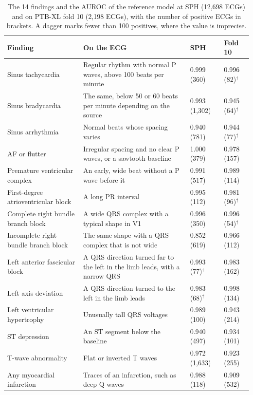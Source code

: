 \documentclass[letterpaper,11pt]{article}
\begin{document}
\begin{table}[H]
  \centering
  \caption{The 14 findings and the AUROC of the reference model at SPH (12,698 ECGs) and on PTB-XL fold 10 (2,198 ECGs), with the number of positive ECGs in brackets. A dagger marks fewer than 100 positives, where the value is imprecise.}
  \label{tab:conditions}
  \small
  \begin{tabular}{p{3.6cm}p{6.6cm}ll}
    \toprule
    Finding & On the ECG & SPH & Fold 10 \\
    \midrule
    Sinus tachycardia & Regular rhythm with normal P waves, above 100 beats per minute & 0.999 (360) & 0.996 (82)$^\dagger$ \\
    Sinus bradycardia & The same, below 50 or 60 beats per minute depending on the source & 0.993 (1,302) & 0.945 (64)$^\dagger$ \\
    Sinus arrhythmia & Normal beats whose spacing varies & 0.940 (781) & 0.944 (77)$^\dagger$ \\
    AF or flutter & Irregular spacing and no clear P waves, or a sawtooth baseline & 1.000 (379) & 0.978 (157) \\
    Premature ventricular complex & An early, wide beat without a P wave before it & 0.991 (517) & 0.989 (114) \\
    First-degree atrioventricular block & A long PR interval & 0.995 (112) & 0.981 (96)$^\dagger$ \\
    Complete right bundle branch block & A wide QRS complex with a typical shape in V1 & 0.996 (350) & 0.996 (54)$^\dagger$ \\
    Incomplete right bundle branch block & The same shape with a QRS complex that is not wide & 0.852 (619) & 0.966 (112) \\
    Left anterior fascicular block & A QRS direction turned far to the left in the limb leads, with a narrow QRS & 0.993 (77)$^\dagger$ & 0.983 (162) \\
    Left axis deviation & A QRS direction turned to the left in the limb leads & 0.983 (68)$^\dagger$ & 0.998 (134) \\
    Left ventricular hypertrophy & Unusually tall QRS voltages & 0.989 (100) & 0.943 (214) \\
    ST depression & An ST segment below the baseline & 0.940 (497) & 0.934 (101) \\
    T-wave abnormality & Flat or inverted T waves & 0.972 (1,633) & 0.923 (255) \\
    Any myocardial infarction & Traces of an infarction, such as deep Q waves & 0.988 (118) & 0.909 (532) \\
    \bottomrule
  \end{tabular}
\end{table}
\end{document}
